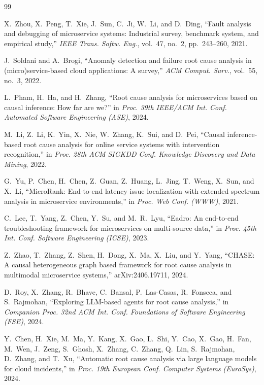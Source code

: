 \documentclass[conference,a4paper]{IEEEtran}
\begin{document}
\begin{thebibliography}{99}

X.~Zhou, X.~Peng, T.~Xie, J.~Sun, C.~Ji, W.~Li, and D.~Ding, ``Fault analysis and debugging of microservice systems: Industrial survey, benchmark system, and empirical study,'' \emph{IEEE Trans. Softw. Eng.}, vol.~47, no.~2, pp.~243--260, 2021.

J.~Soldani and A.~Brogi, ``Anomaly detection and failure root cause analysis in (micro)service-based cloud applications: A survey,'' \emph{ACM Comput. Surv.}, vol.~55, no.~3, 2022.

L.~Pham, H.~Ha, and H.~Zhang, ``Root cause analysis for microservices based on causal inference: How far are we?'' in \emph{Proc. 39th IEEE/ACM Int. Conf. Automated Software Engineering (ASE)}, 2024.

M.~Li, Z.~Li, K.~Yin, X.~Nie, W.~Zhang, K.~Sui, and D.~Pei, ``Causal inference-based root cause analysis for online service systems with intervention recognition,'' in \emph{Proc. 28th ACM SIGKDD Conf. Knowledge Discovery and Data Mining}, 2022.

G.~Yu, P.~Chen, H.~Chen, Z.~Guan, Z.~Huang, L.~Jing, T.~Weng, X.~Sun, and X.~Li, ``MicroRank: End-to-end latency issue localization with extended spectrum analysis in microservice environments,'' in \emph{Proc. Web Conf. (WWW)}, 2021.

C.~Lee, T.~Yang, Z.~Chen, Y.~Su, and M.~R.~Lyu, ``Eadro: An end-to-end troubleshooting framework for microservices on multi-source data,'' in \emph{Proc. 45th Int. Conf. Software Engineering (ICSE)}, 2023.

Z.~Zhao, T.~Zhang, Z.~Shen, H.~Dong, X.~Ma, X.~Liu, and Y.~Yang, ``CHASE: A causal heterogeneous graph based framework for root cause analysis in multimodal microservice systems,'' arXiv:2406.19711, 2024.

D.~Roy, X.~Zhang, R.~Bhave, C.~Bansal, P.~Las-Casas, R.~Fonseca, and S.~Rajmohan, ``Exploring LLM-based agents for root cause analysis,'' in \emph{Companion Proc. 32nd ACM Int. Conf. Foundations of Software Engineering (FSE)}, 2024.

Y.~Chen, H.~Xie, M.~Ma, Y.~Kang, X.~Gao, L.~Shi, Y.~Cao, X.~Gao, H.~Fan, M.~Wen, J.~Zeng, S.~Ghosh, X.~Zhang, C.~Zhang, Q.~Lin, S.~Rajmohan, D.~Zhang, and T.~Xu, ``Automatic root cause analysis via large language models for cloud incidents,'' in \emph{Proc. 19th European Conf. Computer Systems (EuroSys)}, 2024.


\end{thebibliography}
\end{document}
